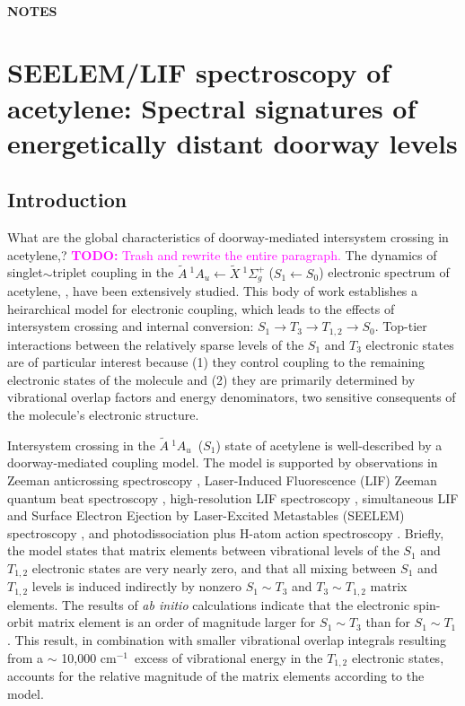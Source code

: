 \documentclass[12pt]{mitthesis}
\newcommand{\TODO} [1]{\textcolor{magenta}{\textbf{TODO:} #1}}
\newcommand{\rcm}{cm$^{-1}$}
\newcommand{\bigspace}{$
  \;
  $}
\newcommand{\astate}{$
  \tilde{A} \: ^1\!A_u
  $}
\newcommand{\AtoX}{$
  \tilde{A} \: ^1\!A_u 
  \leftarrow 
  \tilde{X} \: ^1\Sigma_g^+
  $}
\newcommand{\StoS}{$
  S_1 \leftarrow S_0
  $}
\begin{document}
\tableofcontents
\clearpage

\listoffigures
\clearpage

\subsubsection*{NOTES}

\clearpage

\setcounter{chapter}{3}
\chapter{SEELEM/LIF spectroscopy of acetylene: Spectral signatures of
  energetically distant doorway levels}

\section{Introduction}

What are the global characteristics of doorway-mediated intersystem
crossing in acetylene,?  \TODO{Trash and rewrite the entire
  paragraph.}  The dynamics of singlet$\sim$triplet coupling in the
\AtoX \bigspace (\StoS) electronic spectrum of acetylene, ,
have been extensively studied.  This body of work establishes a
heirarchical model for electronic coupling, which leads to the effects
of intersystem crossing and internal conversion: $S_1 \rightarrow T_3
\rightarrow T_{1,2} \rightarrow S_0$.  Top-tier interactions between
the relatively sparse levels of the $S_1$ and $T_3$ electronic states
are of particular interest because (1) they control coupling to the
remaining electronic states of the molecule and (2) they are primarily
determined by vibrational overlap factors and energy denominators, two
sensitive consequents of the molecule's electronic structure.

Intersystem crossing in the \astate\ ($S_1$) state of acetylene is
well-described by a doorway-mediated coupling model.  The model is
supported by observations in Zeeman anticrossing spectroscopy
\cite{dupre91, dupre95a, dupre95b}, Laser-Induced Fluorescence (LIF)
Zeeman quantum beat spectroscopy \cite{ochi87, ochi91, dupre93},
high-resolution LIF spectroscopy \cite{drabbels94, altunata01},
simultaneous LIF and Surface Electron Ejection by Laser-Excited
Metastables (SEELEM) spectroscopy \cite{humphrey97, altunata00,
  mishra04}, and photodissociation plus H-atom action spectroscopy
\cite{yamakita03, loffler98, mordaunt98}.  Briefly, the model states
that matrix elements between vibrational levels of the $S_1$ and
$T_{1,2}$ electronic states are very nearly zero, and that all mixing
between $S_1$ and $T_{1,2}$ levels is induced indirectly by nonzero
$S_1 \sim T_3$ and $T_3 \sim T_{1,2}$ matrix elements.  The results of
\emph{ab initio} calculations indicate that the electronic spin-orbit
matrix element is an order of magnitude larger for $S_1 \sim T_3$ than
for $S_1 \sim T_1$.  This result, in combination with smaller
vibrational overlap integrals resulting from a $\sim$ 10,000 \rcm\
excess of vibrational energy in the $T_{1,2}$ electronic states,
accounts for the relative magnitude of the matrix elements according
to the model.
\end{document}
